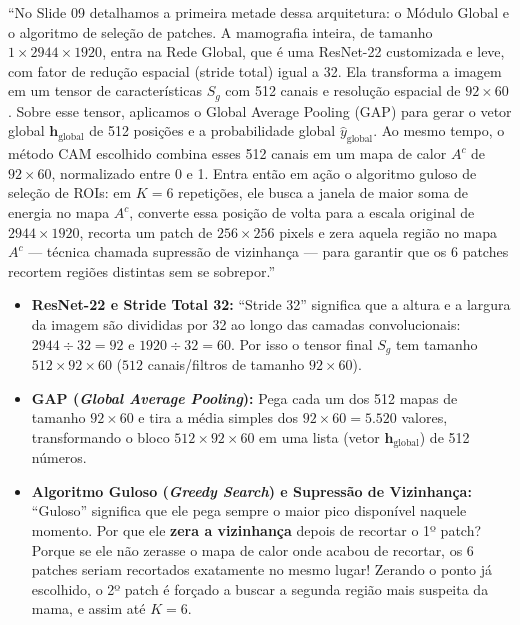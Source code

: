 \documentclass[11pt,a4paper]{article}
\newenvironment{falabox}{%
    \begin{tcolorbox}[colback=speechbg, colframe=speechborder, boxrule=1.2pt, arc=4pt, left=10pt, right=10pt, top=8pt, bottom=8pt, title={\bfseries O QUE VOCÊ DEVE FALAR (Fala Sugerida)}]%
}{%
    \end{tcolorbox}%
}
\newenvironment{explicabox}{%
    \begin{tcolorbox}[colback=explainbg, colframe=explainborder, boxrule=0.8pt, arc=4pt, left=10pt, right=10pt, top=8pt, bottom=8pt, title={\bfseries ENTENDA O QUE VOCÊ ESTÁ FALANDO (Explicação Didática de Cada Termo)}]%
}{%
    \end{tcolorbox}%
}
\begin{document}
\begin{falabox}
``No Slide 09 detalhamos a primeira metade dessa arquitetura: o Módulo Global e o algoritmo de seleção de patches. A mamografia inteira, de tamanho $1 \times 2944 \times 1920$, entra na Rede Global, que é uma ResNet-22 customizada e leve, com fator de redução espacial (stride total) igual a 32. Ela transforma a imagem em um tensor de características $S_g$ com 512 canais e resolução espacial de $92 \times 60$. Sobre esse tensor, aplicamos o Global Average Pooling (GAP) para gerar o vetor global $\mathbf{h}_{\text{global}}$ de 512 posições e a probabilidade global $\hat{y}_{\text{global}}$. Ao mesmo tempo, o método CAM escolhido combina esses 512 canais em um mapa de calor $A^c$ de $92 \times 60$, normalizado entre 0 e 1. Entra então em ação o algoritmo guloso de seleção de ROIs: em $K = 6$ repetições, ele busca a janela de maior soma de energia no mapa $A^c$, converte essa posição de volta para a escala original de $2944 \times 1920$, recorta um patch de $256 \times 256$ pixels e zera aquela região no mapa $A^c$ — técnica chamada supressão de vizinhança — para garantir que os 6 patches recortem regiões distintas sem se sobrepor.''
\end{falabox}

\begin{explicabox}
\begin{itemize}[leftmargin=*, itemsep=4pt]
    \item \textbf{ResNet-22 e Stride Total 32:} ``Stride 32'' significa que a altura e a largura da imagem são divididas por 32 ao longo das camadas convolucionais: $2944 \div 32 = 92$ e $1920 \div 32 = 60$. Por isso o tensor final $S_g$ tem tamanho $512 \times 92 \times 60$ ($512$ canais/filtros de tamanho $92 \times 60$).
    \item \textbf{GAP (\textit{Global Average Pooling}):} Pega cada um dos 512 mapas de tamanho $92 \times 60$ e tira a média simples dos $92 \times 60 = 5.520$ valores, transformando o bloco $512 \times 92 \times 60$ em uma lista (vetor $\mathbf{h}_{\text{global}}$) de 512 números.
    \item \textbf{Algoritmo Guloso (\textit{Greedy Search}) e Supressão de Vizinhança:} ``Guloso'' significa que ele pega sempre o maior pico disponível naquele momento. Por que ele \textbf{zera a vizinhança} depois de recortar o 1º patch? Porque se ele não zerasse o mapa de calor onde acabou de recortar, os 6 patches seriam recortados exatamente no mesmo lugar! Zerando o ponto já escolhido, o 2º patch é forçado a buscar a segunda região mais suspeita da mama, e assim até $K=6$.
\end{itemize}
\end{explicabox}
\end{document}
